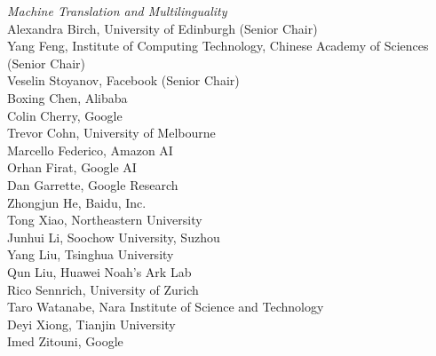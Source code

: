 \emph{Machine Translation and Multilinguality} \\
\hspace*{0.2in} Alexandra Birch, University of Edinburgh (Senior Chair)\\
\hspace*{0.2in} Yang Feng, Institute of Computing Technology, Chinese Academy of Sciences (Senior Chair)\\
\hspace*{0.2in} Veselin Stoyanov, Facebook (Senior Chair)\\
\hspace*{0.2in} Boxing Chen, Alibaba\\
\hspace*{0.2in} Colin Cherry, Google\\
\hspace*{0.2in} Trevor Cohn, University of Melbourne\\
\hspace*{0.2in} Marcello Federico, Amazon AI\\
\hspace*{0.2in} Orhan Firat, Google AI\\
\hspace*{0.2in} Dan Garrette, Google Research\\
\hspace*{0.2in} Zhongjun He, Baidu, Inc.\\
\hspace*{0.2in} Tong Xiao, Northeastern University\\
\hspace*{0.2in} Junhui Li, Soochow University, Suzhou\\
\hspace*{0.2in} Yang Liu, Tsinghua University\\
\hspace*{0.2in} Qun Liu, Huawei Noah's Ark Lab\\
\hspace*{0.2in} Rico Sennrich, University of Zurich\\
\hspace*{0.2in} Taro Watanabe, Nara Institute of Science and Technology\\
\hspace*{0.2in} Deyi Xiong, Tianjin University\\
\hspace*{0.2in} Imed Zitouni, Google\\

